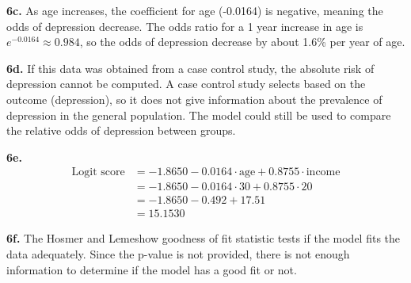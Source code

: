\documentclass{article}
\begin{document}
\textbf{6c.}
As age increases, the coefficient for age (-0.0164) is negative, meaning the odds of depression decrease. The odds ratio for a 1 year increase in age is $e^{-0.0164} \approx 0.984$, so the odds of depression decrease by about 1.6\% per year of age.

\textbf{6d.}
If this data was obtained from a case control study, the absolute risk of depression cannot be computed. A case control study selects based on the outcome (depression), so it does not give information about the prevalence of depression in the general population. The model could still be used to compare the relative odds of depression between groups.

\textbf{6e.}
\begin{equation*}
\begin{split}
\text{Logit score} &= -1.8650 - 0.0164 \cdot \text{age} + 0.8755 \cdot \text{income} \\
&= -1.8650 - 0.0164 \cdot 30 + 0.8755 \cdot 20 \\
&= -1.8650 - 0.492 + 17.51 \\
&= 15.1530
\end{split}
\end{equation*}

\textbf{6f.}
The Hosmer and Lemeshow goodness of fit statistic tests if the model fits the data adequately. Since the p-value is not provided, there is not enough information to determine if the model has a good fit or not.
\end{document}
